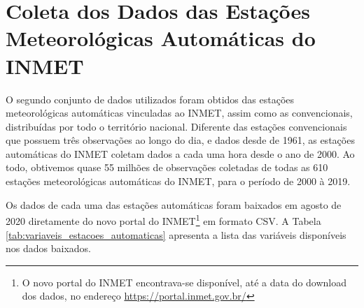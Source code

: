 \section{Coleta dos Dados das Estações Meteorológicas Automáticas do INMET}

O segundo conjunto de dados utilizados foram obtidos das estações meteorológicas automáticas vinculadas ao INMET, assim como as convencionais, distribuídas por todo o território nacional. Diferente das estações convencionais que possuem três observações ao longo do dia, e dados desde de 1961, as estações automáticas do INMET coletam dados a cada uma hora desde o ano de 2000. Ao todo, obtivemos quase 55 milhões de observações coletadas de todas as 610 estações meteorológicas automáticas do INMET, para o período de 2000 à 2019.

Os dados de cada uma das estações automáticas foram baixados em agosto de 2020 diretamente do novo portal do INMET\footnote{O novo portal do INMET encontrava-se disponível, até a data do download dos dados, no endereço \href{https://portal.inmet.gov.br/}{https://portal.inmet.gov.br/}} em formato CSV. A Tabela  \ref{tab:variaveis_estacoes_automaticas} apresenta a lista das variáveis disponíveis nos dados baixados.


